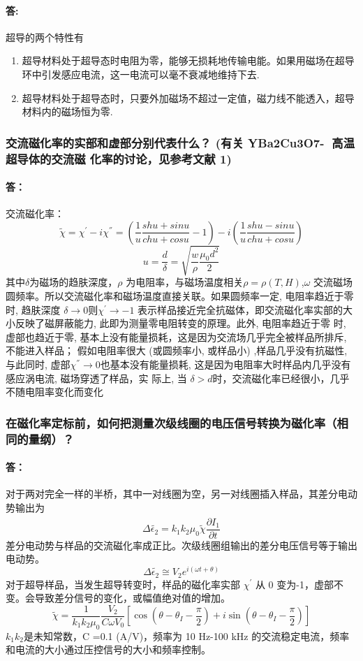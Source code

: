 \documentclass{ctexart}
\theoremstyle{ansstyle}
\begin{document}
\paragraph{答:} 超导的两个特性有
\begin{enumerate}
    \item 超导材料处于超导态时电阻为零，能够无损耗地传输电能。如果用磁场在超导环中引发感应电流，这一电流可以毫不衰减地维持下去.
    \item 超导材料处于超导态时，只要外加磁场不超过一定值，磁力线不能透入，超导材料内的磁场恒为零.
\end{enumerate}

\subsubsection{交流磁化率的实部和虚部分别代表什么？ (有关 YBa2Cu3O7- 高温超导体的交流磁
    化率的讨论，见参考文献 1) }
\paragraph{答：} 交流磁化率：
$$\widetilde{\chi}  =\chi^{'}-i\chi^{''}=(\frac{1}{u}\frac{shu+sinu}{chu+cosu}-1 )-i(\frac{1}{u}\frac{shu-sinu}{chu+cos u}  )  $$
$$ u =\frac{d }{\delta}=\sqrt{\frac{w}{\rho}\frac{\mu_{0}d^{2}}{2}  } $$
其中$ \delta $为磁场的趋肤深度，$ \rho $ 为电阻率，与磁场温度相关$\rho=\rho(T,H)$,$ \omega $
交流磁场圆频率。所以交流磁化率和磁场温度直接关联。如果圆频率一定, 电阻率趋近于零时, 趋肤深度
$ \delta \to 0 $则$ \chi^{'}\to -1 $  表示样品接近完全抗磁体，即交流磁化率实部的大小反映了磁屏蔽能力, 此即为测量零电阻转变的原理。此外, 电阻率趋近于零 时,
虚部也趋近于零, 基本上没有能量损耗，这是因为交流场几乎完全被样品所排斥, 不能进入样品；
假如电阻率很大 (或圆频率小, 或样品小) ,样品几乎没有抗磁性, 与此同时, 虚部$ \chi^{''} \to 0$也基本没有能量损耗, 这是因为电阻率大时样品内几乎没有感应涡电流, 磁场穿透了样品，实 际上, 当
$\delta > d$时，交流磁化率已经很小，几乎不随电阻率变化而变化
\subsubsection{ 在磁化率定标前，如何把测量次级线圈的电压信号转换为磁化率（相同的量纲）？}
\paragraph{答：}对于两对完全一样的半桥，其中一对线圈为空，另一对线圈插入样品，其差分电动势输出为
$$ \Delta \widetilde{\epsilon_{2}}=k_{1}k_{2}\mu_{0}\widetilde{\chi}\frac{\partial \widehat{I_{1}}}{\partial t}  $$
差分电动势与样品的交流磁化率成正比。次级线圈组输出的差分电压信号等于输出电动势。
$$ \Delta \widetilde{\epsilon_{2}}\cong V_{2}e^{i(\omega t +\theta)}$$
对于超导样品，当发生超导转变时，样品的磁化率实部 $ \chi^{'} $ 从 0 变为-1，虚部不变。会导致差分信号的变化，或幅值绝对值的增加。
$$ \widetilde{\chi} =\frac{1}{k_{1}k_{2}\mu_{0}}\frac{V_{2}}{C\omega V_{0}}[\cos(\theta-\theta_{I}-\frac{\pi}{2})+i\sin(\theta-\theta_{I}-\frac{\pi}{2})]    $$
$k_{1}k_{2}$是未知常数，C =0.1 (A/V)，频率为 10 Hz-100 kHz 的交流稳定电流，频率和电流的大小通过压控信号的大小和频率控制。
\end{document}
